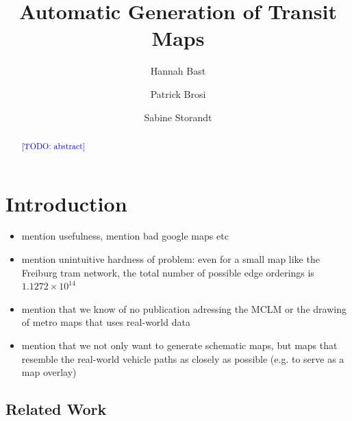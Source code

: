 \documentclass{llncs}
\newcommand\todo[1]{\textcolor{blue}{[TODO: #1]}}
\begin{document}
%
\mainmatter
%
\title{Automatic Generation of Transit Maps}
%
%
\author{Hannah Bast \and Patrick Brosi \and
Sabine Storandt}
%
%
%

\maketitle

\begin{abstract}
	\todo{abstract}
\end{abstract}


%
\section{Introduction}\label{SEC:intro}
%

\begin{itemize}
	\item mention usefulness, mention bad google maps etc
	\item mention unintuitive hardness of problem: even for a small map like the Freiburg tram network, the total number of possible edge orderings is $1.1272 \times 10^{14}$
	\item mention that we know of no publication adressing the MCLM or the drawing of metro maps that uses real-world data
	\item mention that we not only want to generate schematic maps, but maps that resemble the real-world vehicle paths as closely as possible (e.g. to serve as a map overlay)
\end{itemize}

%
\subsection{Related Work}\label{SEC:related}
%
\end{document}
